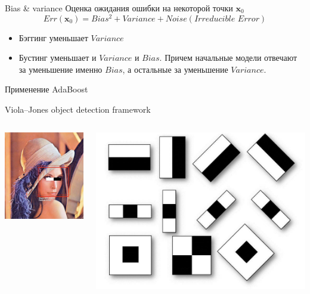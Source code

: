 \documentclass[10pt]{beamer}
\begin{document}
\begin{frame}{Bias \& variance}
Оценка ожидания ошибки на некоторой точки $\mathbf{x}_0$
\[
    Err(\mathbf{x}_0) = Bias^2 + Variance + Noise (Irreducible\,\, Error)
\]
\begin{itemize}
    \item Бэггинг уменьшает $Variance$
    \item Бустинг уменьшает и $Variance$ и $Bias$. Причем начальные модели отвечают
    за уменьшение именно $Bias$, а остальные за уменьшение $Variance$.
\end{itemize}
\end{frame}

\begin{frame}{Применение AdaBoost}
\begin{block}{Viola–Jones object detection framework}
\end{block}
\begin{columns}[C]
    \begin{column}{.5\textwidth}
    \begin{center}
        \includegraphics[scale=0.3]{images/violalena.jpg}
    \end{center}
    \end{column}
    \begin{column}{.5\textwidth}
        \begin{center}
            \includegraphics[scale=0.3]{images/violabase.jpg}

\end{center}
\end{column}
\end{columns}
\end{frame}
\end{document}
